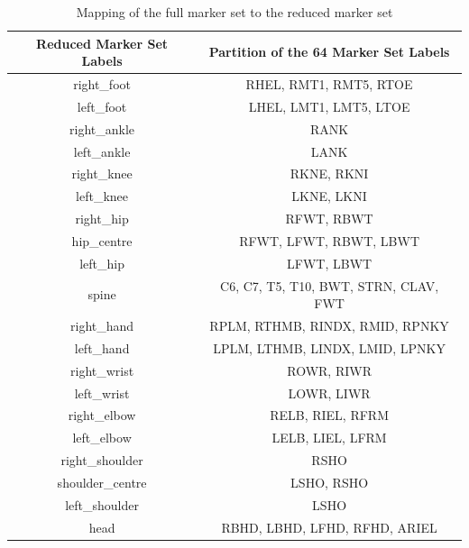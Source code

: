 \begin{table}[H]
    \centering
    \begin{tabular}{|c|c|}
        \hline
        \textbf{Reduced Marker Set Labels} & \textbf{Partition of the 64 Marker Set Labels} \\
        \hline
        right\_foot & RHEL, RMT1, RMT5, RTOE \\
        left\_foot & LHEL, LMT1, LMT5, LTOE \\
        right\_ankle & RANK \\
        left\_ankle & LANK \\
        right\_knee & RKNE, RKNI \\
        left\_knee & LKNE, LKNI \\
        right\_hip & RFWT, RBWT \\
        hip\_centre & RFWT, LFWT, RBWT, LBWT \\
        left\_hip & LFWT, LBWT \\
        spine & C6, C7, T5, T10, BWT, STRN, CLAV, FWT \\
        right\_hand & RPLM, RTHMB, RINDX, RMID, RPNKY\\
        left\_hand & LPLM, LTHMB, LINDX, LMID, LPNKY \\
        right\_wrist & ROWR, RIWR \\
        left\_wrist & LOWR, LIWR \\
        right\_elbow & RELB, RIEL, RFRM\\
        left\_elbow & LELB, LIEL, LFRM \\
        right\_shoulder & RSHO \\
        shoulder\_centre & LSHO, RSHO \\
        left\_shoulder & LSHO \\
        head & RBHD, LBHD, LFHD, RFHD, ARIEL \\
        \hline
    \end{tabular}
    \caption{Mapping of the full marker set to the reduced marker set}
    \label{tab:labels_joints}
\end{table}
